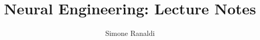 \usepackage[backend=biber,style=alphabetic,sorting=nty,maxalphanames=1]{biblatex}
\renewcommand*{\labelalphaothers}{}

\DeclareNolabel{ %
  \nolabel{\regexp{[\p{Z}\p{P}\p{S}\p{C}]+}}
}
\usepackage[english]{babel}
\usepackage{indentfirst} %
\usepackage{graphicx}
\usepackage{url}
\usepackage{csquotes}
\usepackage{amssymb}
\usepackage{pdfpages}

\usepackage[includeheadfoot, margin=1in]{geometry} %
\usepackage[width = 0.75\textwidth, font = small]{caption} %

\usepackage{fancyhdr}
\pagestyle{fancy}
\fancyhf{}
\fancyhead[L]{\scshape\nouppercase{\leftmark}} 
\fancyhead[R]{\scshape\thepage}



\setcounter{tocdepth}{1} %

\usepackage{setspace} %
\doublespacing

\newcommand{\tsp}{\textsuperscript} %
\newcommand{\tsb}{\textsubscript} %
\newcommand{\ie}{\emph{i.e. }}
\newcommand{\eg}{\emph{e.g. }}

\title{Neural Engineering: Lecture Notes}
\author{Simone Ranaldi}